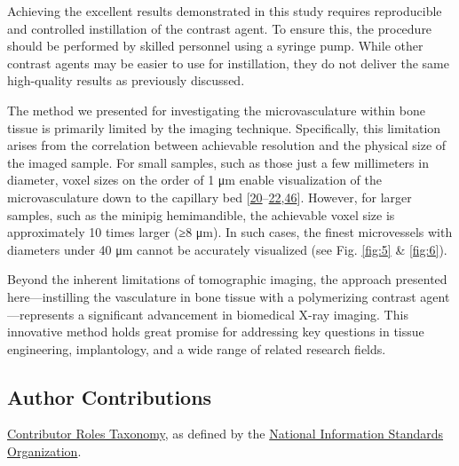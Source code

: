 Achieving the excellent results demonstrated in this study requires reproducible and controlled instillation of the contrast agent.
To ensure this, the procedure should be performed by skilled personnel using a syringe pump.
While other contrast agents may be easier to use for instillation, they do not deliver the same high-quality results as previously discussed.

The method we presented for investigating the microvasculature within bone tissue is primarily limited by the imaging technique.
Specifically, this limitation arises from the correlation between achievable resolution and the physical size of the imaged sample.
For small samples, such as those just a few millimeters in diameter, voxel sizes on the order of 1 μm enable visualization of the microvasculature down to the capillary bed {[}\protect\hyperlink{ref-TYAmre95}{20}--\protect\hyperlink{ref-ijqzbOI6}{22},\protect\hyperlink{ref-iM9i6gkJ}{46}{]}.
However, for larger samples, such as the minipig hemimandible, the achievable voxel size is approximately 10 times larger (≥8 μm).
In such cases, the finest microvessels with diameters under 40 μm cannot be accurately visualized (see Fig. \ref{fig:5} \& \ref{fig:6}).

Beyond the inherent limitations of tomographic imaging, the approach presented here---instilling the vasculature in bone tissue with a polymerizing contrast agent---represents a significant advancement in biomedical X-ray imaging.
This innovative method holds great promise for addressing key questions in tissue engineering, implantology, and a wide range of related research fields.

\hypertarget{author-contributions}{%
\subsection{Author Contributions}\label{author-contributions}}

\href{https://credit.niso.org/}{Contributor Roles Taxonomy}, as defined by the \href{https://credit.niso.org/contributor-roles-defined/}{National Information Standards Organization}.

